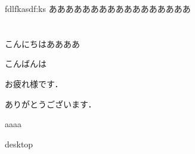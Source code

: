 \documentclass[dvipdfmx,report,11pt]{jsarticle}
\title{}
\author{funaki}
\date{\today}
\begin{document}
\newcommand{\ctext}[1]{\raise0.2ex\hbox{\textcircled{\scriptsize{#1}}}}
\maketitle

fdlfkasdf:ks
あああああああああああああああああ
\section{}
こんにちはああああ

こんばんは

お疲れ様です．

ありがとうございます．

aaaa


desktop
\end{document}
